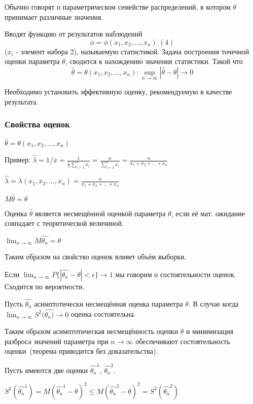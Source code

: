 \documentclass[12pt,a4paper,oneside]{extarticle}
\begin{document}
        Обычно говорят о параметрическом семействе распределений, в котором $\theta$ принимает различные значения.

        Вводят функцию от результатов наблюдений $$\phi=\phi(x_1,x_2,...,x_n) ~(4)$$ ($x_i$ - элемент набора 2), называемую статистикой. Задача построения точечной оценки параметра $\theta$, сводится к нахождению значения статистики. Такой что $$\hat{\theta}=\theta(x_1, x_2, ..., x_n): \sup_{n\rightarrow \infty} |\hat{\theta} - \theta| \rightarrow 0$$

        Необходимо установить эффективную оценку, рекомендуемую в качестве результата.

        \subsubsection{Свойства оценок}
        $\hat{\theta}=\theta(x_1, x_2, ..., x_n)$

        Пример:
        $\hat{\lambda}=1/\overline{x} = \frac{1}{\frac{1}{n} \sum_{i=1}^{n}x_i} = \frac{n}{\sum_{i=1}^{n}x_i} = \frac{n}{x_1+x_2+...+x_n}$

        $\hat{\lambda}=\lambda(x_1, x_2, ..., x_n)=\frac{n}{x_1+x_2+...+x_n}$

        $M\hat{\theta}=\theta$

        Оценка $\hat{\theta}$ является несмещённой оценкой параметра $\theta$, если её мат. ожидание совпадает с теоритической величиной.

        $\lim_{n \rightarrow \infty} M\hat{\theta_n}=\theta$

        Таким образом на свойство оценок влияет объём выборки.

        Если $\lim_{n \rightarrow \infty} P\{|\hat{\theta_n}-\theta| < \epsilon \}\rightarrow 1$ мы говорим о состоятельности оценок. Сходится по вероятности.

        Пусть $\hat{\theta_n}$ асимптотически несмещённая оценка параметра $\theta$. В случае когда $\lim_{n\rightarrow\infty} S^2(\hat{\theta_n)}\rightarrow 0$ оценка состоятельна.

        Таким образом асимптотическая несмещённость оценки $\theta$ и минимизация разброса значений параметра при $n \rightarrow \infty$ обеспечивают состоятельность оценки~(теорема приводится без доказательства).

        Пусть имеются две оценки $\hat{\theta_n}^1$, $\hat{\theta_n}^2$.

        $S^2(\hat{\theta_n}^1)=M(\hat{\theta_n}^1 - \theta)^2 \leq M(\hat{\theta_n}^2 - \theta)^2 = S^2(\hat{\theta_n}^2)$
\end{document}
